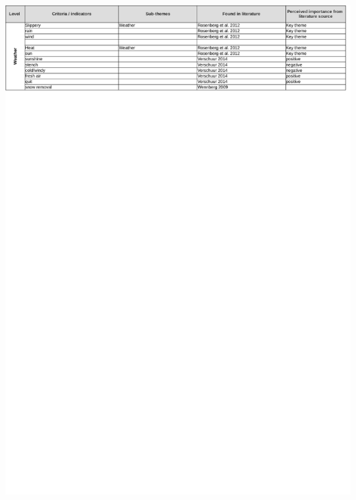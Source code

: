 \begin{appendix}
\includegraphics[width=\textwidth]{img/annex/A5_weather_criteria.pdf}

\end{appendix}
